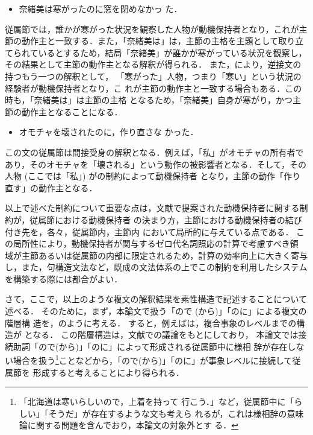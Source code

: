 \begin{itemize}
        \item[\protect\exsref{複文c}] 奈緒美は寒がったのに窓を閉めなかっ
た．
\end{itemize}
従属節では，誰かが寒がった状況を観察した人物が動機保持者となり，これが主
節の動作主と一致する．また，「奈緒美は」は，主節の主格を主題として取り立
てられているとするため，結局「奈緒美」が誰かが寒がっている状況を観察し，
その結果として主節の動作主となる解釈が得られる．
また，により，逆接文の持つもう一つの解釈として，
「寒がった」人物，つまり「寒い」という状況の経験者が動機保持者となり，こ
れが主節の動作主と一致する場合もある．この時も，「奈緒美は」は主節の主格
となるため，「奈緒美」自身が寒がり，かつ主節の動作主となることになる．

\begin{itemize}
        \item[\protect\exsref{複文d}] オモチャを壊されたのに，作り直さな
かった．
\end{itemize}
この文の従属節は間接受身の解釈となる．例えば，「私」がオモチャの所有者で
あり，そのオモチャを「壊される」という動作の被影響者となる．そして，その
人物 (ここでは「私」) がの制約によって動機保持者
となり，主節の動作「作り直す」の動作主となる．

以上で述べた制約について重要な点は，文献\cite{中川:複文の意味論,
COLING94}で提案された動機保持者に関する制約が，従属節における動機保持者
の決まり方，主節における動機保持者の結び付き先を，各々，従属節内，主節内
において局所的に与えている点である．
この局所性により，動機保持者が関与するゼロ代名詞照応の計算で考慮すべき領
域が主節あるいは従属節の内部に限定されるため，計算の効率向上に大きく寄与
し，また，句構造文法など，既成の文法体系の上でこの制約を利用したシステム
を構築する際には都合がよい．

さて，ここで，以上のような複文の解釈結果を素性構造で記述することについて
述べる．
そのために，まず，本論文で扱う「ので (から)」「のに」による複文の階層構
造を，のように考える．
すると，例えばは，複合事象のレベルまでの構造が
となる．
この階層構造は，文献\cite{郡司:制約に基づく文法}での議論をもとにしており，
本論文では接続助詞「ので(から)」「のに」によって形成される従属節中に様相
辞が存在しない場合を扱う\footnote{「北海道は寒いらしいので，上着を持って
行こう．」など，従属節中に「らしい」「そうだ」が存在するような文も考えら
れるが，これは様相辞の意味論に関する問題を含んでおり，本論文の対象外とす
る．}ことなどから，「ので(から)」「のに」が事象レベルに接続して従属節を
形成すると考えることにより得られる．


